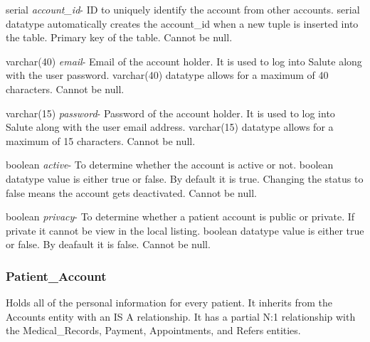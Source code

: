 \begin{description}
\item serial \textit{account\_id}- ID to uniquely identify the account from other accounts. serial datatype automatically creates the account\_id when a new tuple is inserted into the table.  Primary key of the table.  Cannot be null.
\item varchar(40) \textit{email}- Email of the account holder. It is used to log into Salute along with the user password.  varchar(40) datatype allows for a maximum of 40 characters.  Cannot be null.
\item varchar(15) \textit{password}-  Password of the account holder.  It is used to log into Salute along with the user email address.  varchar(15) datatype allows for a maximum of 15 characters.  Cannot be null.
\item boolean \textit{active}- To determine whether the account is active or not.  boolean datatype value is either true or false.  By default it is true.  Changing the status to false means the account gets deactivated.  Cannot be null.
\item boolean \textit{privacy}- To determine whether a patient account is public or private.  If private it cannot be view in the local listing.  boolean datatype value is either true or false.  By deafault it is false. Cannot be null.
\end{description}

\subsubsection{Patient\_Account}
Holds all of the personal information for every patient.  It inherits from the Accounts entity with an IS A relationship.  It has a partial N:1 relationship with the Medical\_Records, Payment, Appointments, and Refers entities.

